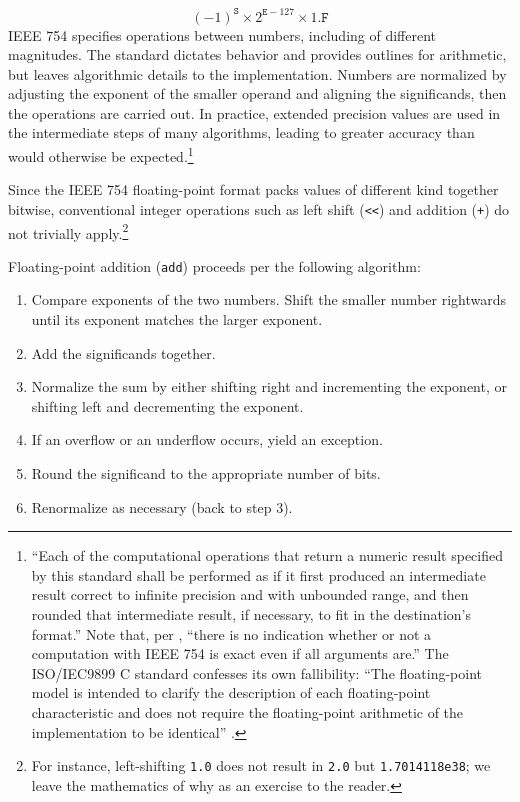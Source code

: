 \documentclass[twoside]{article}
\begin{document}
$$
(-1)^{\mathtt{S}} \times 2^{\mathtt{E}-127} \times 1.\mathtt{F}
$$
\noindent
IEEE 754 specifies operations between numbers, including of different magnitudes.  The standard dictates behavior and provides outlines for arithmetic, but leaves algorithmic details to the implementation.  Numbers are normalized by adjusting the exponent of the smaller operand and aligning the significands, then the operations are carried out.  In practice, extended precision values are used in the intermediate steps of many algorithms, leading to greater accuracy than would otherwise be expected.\footnote{“Each of the computational operations that return a numeric result specified by this standard shall be performed as if it first produced an intermediate result correct to infinite precision and with unbounded range, and then rounded that intermediate result, if necessary, to fit in the destination’s format.”  \citep{IEEE754-2008}  Note that, per \citeauthor{Risse2016}, “there is no indication whether or not a computation with IEEE 754 is exact even if all arguments are.”  The ISO/IEC9899 C standard confesses its own fallibility:  “The floating-point model is intended to clarify the description of each floating-point characteristic and does not require the floating-point arithmetic of the implementation to be identical” \citep[fn.~21]{ISO9899}.}

Since the IEEE 754 floating-point format packs values of different kind together bitwise, conventional integer operations such as left shift (\texttt{<<}) and addition (\texttt{+}) do not trivially apply.\footnote{For instance, left-shifting \texttt{1.0} does not result in \texttt{2.0} but \texttt{1.7014118e38}; we leave the mathematics of why as an exercise to the reader.}

Floating-point addition (\texttt{add}) proceeds per the following algorithm:

\begin{enumerate}
  \item  Compare exponents of the two numbers.  Shift the smaller number rightwards until its exponent matches the larger exponent.
  \item  Add the significands together.
  \item  Normalize the sum by either shifting right and incrementing the exponent, or shifting left and decrementing the exponent.
  \item  If an overflow or an underflow occurs, yield an exception.
  \item  Round the significand to the appropriate number of bits.
  \item  Renormalize as necessary (back to step 3).
\end{enumerate}
\end{document}
